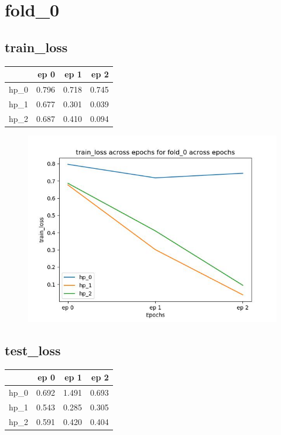 \documentclass{article}
\begin{document}
\section{fold\_0}
\subsection{train\_loss}
\begin{tabular}{lrrr}
\toprule
{} &   ep 0 &   ep 1 &   ep 2 \\
\midrule
hp\_0 &  0.796 &  0.718 &  0.745 \\
hp\_1 &  0.677 &  0.301 &  0.039 \\
hp\_2 &  0.687 &  0.410 &  0.094 \\
\bottomrule
\end{tabular}

\begin{figure}[H]
\includegraphics[scale = 0.75]{fold_0/train_loss}
\end{figure}
\subsection{test\_loss}
\begin{tabular}{lrrr}
\toprule
{} &   ep 0 &   ep 1 &   ep 2 \\
\midrule
hp\_0 &  0.692 &  1.491 &  0.693 \\
hp\_1 &  0.543 &  0.285 &  0.305 \\
hp\_2 &  0.591 &  0.420 &  0.404 \\
\bottomrule
\end{tabular}
\end{document}
